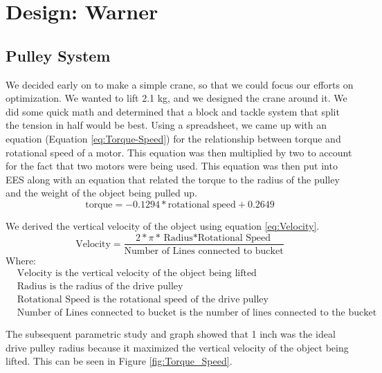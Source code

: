 \documentclass[letterpaper, 12pt]{article}
\begin{document}
\section{Design: Warner}

\subsection{Pulley System}
We decided early on to make a simple crane, so that we could focus our efforts on optimization.
We wanted to lift 2.1 kg, and we designed the crane around it. 
We did some quick math and determined that a block and tackle system that split the tension in half would be best. 
Using a spreadsheet, we came up with an equation (Equation \ref{eq:Torque-Speed}) for the relationship between torque and rotational speed of a motor. 
This equation was then multiplied by two to account for the fact that two motors were being used. 
This equation was then put into EES along with an equation that related the torque to the radius of the pulley and the weight of the object being pulled up.
\begin{equation}
    \text{torque}=-0.1294 * \text{rotational speed}+0.2649 \label{eq:Torque-Speed} 
\end{equation}


We derived the vertical velocity of the object using equation \ref{eq:Velocity}.
\begin{equation}
        \text{Velocity}=\frac{2*\pi*{\text{Radius}*\text{Rotational Speed}}}{\text{Number of Lines connected to bucket}} \label{eq:Velocity}
\end{equation}
Where:
\begin{equation}
    \begin{split}
       & \text{Velocity} \text{ is the vertical velocity of the object being lifted} \\
        &\text{Radius}  \text{ is the radius of the drive pulley} \\
        &\text{Rotational Speed}  \text{ is the rotational speed of the drive pulley} \\
        &\text{Number of Lines connected to bucket}  \text{ is the number of lines connected to the bucket}
    \end{split}
\end{equation}

The subsequent parametric study and graph showed that 1 inch was the ideal drive pulley radius because it maximized the vertical velocity of the object being lifted.  This can be seen in Figure \ref{fig:Torque_Speed}.
\end{document}
